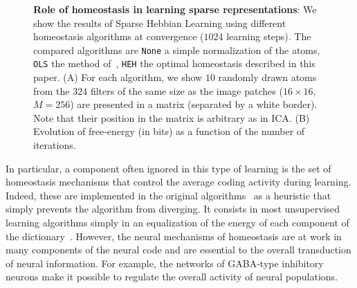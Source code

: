 \documentclass[a4paper, 11pt, draft]{article} %
\begin{document}
\begin{figure}%
\caption{
{\bf Role of homeostasis in learning sparse representations}:
We show the results of Sparse Hebbian Learning using different homeostasis algorithms at convergence ($1024$ learning steps). The compared algorithms are \texttt{None} a simple normalization of the atoms, \texttt{OLS} the method of~\citep{Olshausen97}, \texttt{HEH} the optimal homeostasis described in this paper. {\sf (A)} For each algorithm, we show $10$ randomly drawn atoms from the $324$ filters of the same size as the image patches ($16 \times 16$, $M=256$) are presented in a matrix (separated by a white border). Note that their position in the matrix is arbitrary as in ICA. {\sf (B)} Evolution of free-energy (in bits) as a function of the number of iterations. %
\label{fig:map}}%
\end{figure}%
In particular, a component often ignored in this type of learning is the set of homeostasis mechanisms that control the average coding activity during learning. Indeed, these are implemented in the original algorithms~\citep{Olshausen97} as a heuristic that simply prevents the algorithm from diverging. It consists in most unsupervised learning algorithms simply in an equalization of the energy of each component of the dictionary~\citep{Mairal11}. However, the neural mechanisms of homeostasis are at work in many components of the neural code and are essential to the overall transduction of neural information. For example, the networks of GABA-type inhibitory neurons make it possible to regulate the overall activity of neural populations. %
\end{document}
